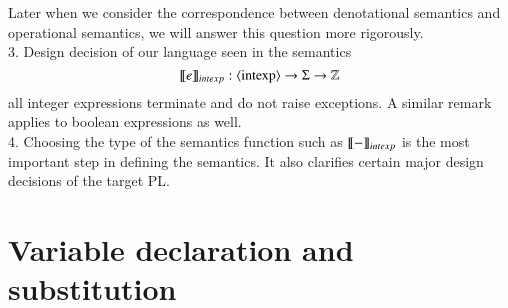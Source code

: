 \documentclass{report}[12pt]
\begin{document}
Later when we consider the correspondence between denotational semantics and operational semantics, we will answer this question more rigorously.\\
3. Design decision of our language seen in the semantics
\[\llbracket e \rrbracket_{intexp}:\langle \text{intexp}\rangle\rightarrow \Sigma \rightarrow \mathbb{Z}\]
all integer expressions terminate and do not raise exceptions. A similar remark applies to boolean expressions as well. \\
4. Choosing the type of the semantics function such as $\llbracket - \rrbracket_{intexp}$ is the most important step in defining the semantics. It also clarifies certain major design decisions of the target PL.
\section{Variable declaration and substitution}
\end{document}

